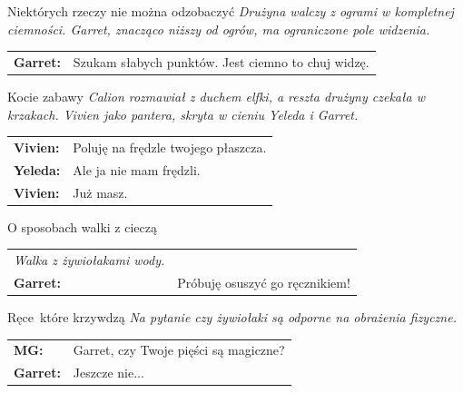 \documentclass[10pt,twoside,twocolumn]{book}
\begin{document}
\begin{rpg-quotebox}{Niektórych rzeczy nie można odzobaczyć}
   \textit{Drużyna walczy z ogrami w kompletnej ciemności. Garret, znacząco niższy od ogrów, ma ograniczone pole widzenia.}\\

   \begin{tabularx}{\columnwidth}{lX}
      \textbf{Garret:} & Szukam słabych punktów. Jest ciemno to chuj widzę.\\
   \end{tabularx}
\end{rpg-quotebox}

\begin{rpg-quotebox}{Kocie zabawy}
   \textit{Calion rozmawiał z duchem elfki, a reszta drużyny czekała w krzakach. Vivien jako pantera, skryta w cieniu Yeleda i Garret.}\\

   \begin{tabularx}{\columnwidth}{lX}
      \textbf{Vivien:} & Poluję na frędzle twojego płaszcza.\\
      \textbf{Yeleda:} & Ale ja nie mam frędzli.\\
      \textbf{Vivien:} & Już masz.\\
   \end{tabularx}
\end{rpg-quotebox}

\begin{rpg-quotebox}{O sposobach walki z cieczą}
   \begin{tabularx}{\columnwidth}{lX}
	   \textit{Walka z żywiołakami wody.}\\
	   \textbf{Garret:} & Próbuję osuszyć go ręcznikiem!\\
   \end{tabularx}
\end{rpg-quotebox}

\begin{rpg-quotebox}{Ręce\, które krzywdzą}
   \textit{Na pytanie czy żywiołaki są odporne na obrażenia fizyczne.}\\
   
   \begin{tabularx}{\columnwidth}{lX}
	   \textbf{MG:} & Garret, czy Twoje pięści są magiczne?\\
	   \textbf{Garret:} & Jeszcze nie...\\
   \end{tabularx}
\end{rpg-quotebox}
\end{document}
